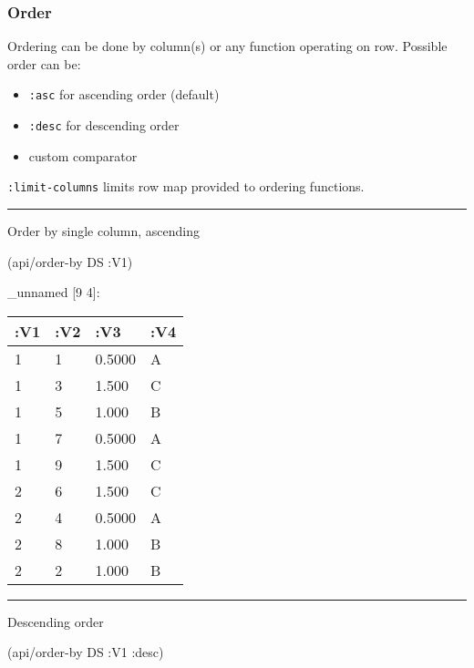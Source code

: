 \documentclass[]{article}
\newenvironment{Shaded}{\begin{snugshade}}{\end{snugshade}}
\newcommand{\AttributeTok}[1]{\textcolor[rgb]{0.77,0.63,0.00}{#1}}
\newcommand{\NormalTok}[1]{#1}
\providecommand{\tightlist}{%
  \setlength{\itemsep}{0pt}\setlength{\parskip}{0pt}}
\begin{document}
\subsubsection{Order}\label{order}

Ordering can be done by column(s) or any function operating on row.
Possible order can be:

\begin{itemize}
\tightlist
\item
  \texttt{:asc} for ascending order (default)
\item
  \texttt{:desc} for descending order
\item
  custom comparator
\end{itemize}

\texttt{:limit-columns} limits row map provided to ordering functions.

\begin{center}\rule{0.5\linewidth}{0.5pt}\end{center}

Order by single column, ascending

\begin{Shaded}
\begin{Highlighting}[]
\NormalTok{(api/order-by DS }\AttributeTok{:V1}\NormalTok{)}
\end{Highlighting}
\end{Shaded}

\_unnamed {[}9 4{]}:

\begin{longtable}[]{@{}llll@{}}
\toprule
:V1 & :V2 & :V3 & :V4\tabularnewline
\midrule
\endhead
1 & 1 & 0.5000 & A\tabularnewline
1 & 3 & 1.500 & C\tabularnewline
1 & 5 & 1.000 & B\tabularnewline
1 & 7 & 0.5000 & A\tabularnewline
1 & 9 & 1.500 & C\tabularnewline
2 & 6 & 1.500 & C\tabularnewline
2 & 4 & 0.5000 & A\tabularnewline
2 & 8 & 1.000 & B\tabularnewline
2 & 2 & 1.000 & B\tabularnewline
\bottomrule
\end{longtable}

\begin{center}\rule{0.5\linewidth}{0.5pt}\end{center}

Descending order

\begin{Shaded}
\begin{Highlighting}[]
\NormalTok{(api/order-by DS }\AttributeTok{:V1} \AttributeTok{:desc}\NormalTok{)}
\end{Highlighting}
\end{Shaded}
\end{document}
